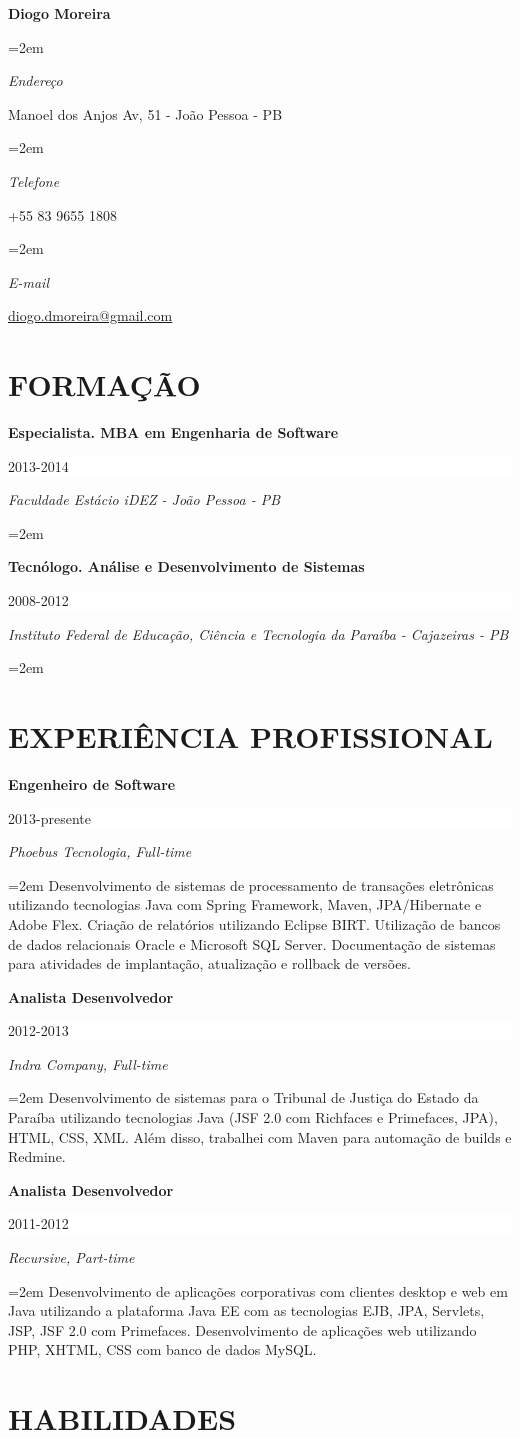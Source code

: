 \documentclass[paper=a4,fontsize=11pt]{article}
\newlength{\spacebox}
\newcommand{\sepspace}{\vspace*{1em}}
\newcommand{\MyName}[1]{ 
	\huge \usefont{OT1}{cmr}{b}{n} 
	\textbf{#1} \par \normalsize \normalfont
}
\newcommand{\NewPart}[1]{ \section*{\large \uppercase{#1}}}
\newcommand{\PersonalEntry}[2]{
		\noindent\hangindent=2em\hangafter=0 		%
		\parbox{\spacebox}{							%
		\textit{#1}}								%
		\hspace{1.5em} #2 \par}						%
\newcommand{\EducationEntry}[4]{
		\noindent \textbf{#1} \hfill 					%
		\colorbox{White}{%
			\parbox{6em}{%
			\hfill\color{Black}#2}} \par				%
		\noindent \textit{#3} \par						%
		\noindent\hangindent=2em\hangafter=0 \small #4 	%
		\normalsize \par}
\begin{document}
\MyName{Diogo Moreira}


\sepspace

\PersonalEntry{Endere\c{c}o}{Manoel dos Anjos Av, 51 - Jo\~ao Pessoa - PB}
\PersonalEntry{Telefone}{+55 83 9655 1808}
\PersonalEntry{E-mail}{\url{diogo.dmoreira@gmail.com}}

\NewPart{Forma\c{c}\~ao}{} 

\EducationEntry{Especialista. MBA em Engenharia de Software}{2013-2014}{Faculdade Est\'acio iDEZ - Jo\~ao Pessoa - PB}{}
\sepspace
\EducationEntry{Tecn\'ologo. An\'alise e Desenvolvimento de Sistemas}{2008-2012}{Instituto Federal de Educa\c{c}\~ao, Ci\^encia e Tecnologia da Para\'iba - Cajazeiras - PB}{}

\NewPart{Experi\^encia Profissional}{}

\EducationEntry{Engenheiro de Software}{2013-presente}{Phoebus Tecnologia, Full-time}{Desenvolvimento de sistemas de processamento de transa\c{c}\~oes eletr\^onicas utilizando tecnologias Java com Spring Framework, Maven, JPA/Hibernate e Adobe Flex. Cria\c{c}\~ao de relat\'orios utilizando Eclipse BIRT. Utiliza\c{c}\~ao de bancos de dados relacionais Oracle e Microsoft SQL Server. Documenta\c{c}\~ao de sistemas para atividades de implanta\c{c}\~ao, atualiza\c{c}\~ao e rollback de vers\~oes.}
\sepspace

\EducationEntry{Analista Desenvolvedor}{2012-2013}{Indra Company, Full-time}{Desenvolvimento de sistemas para o Tribunal de Justi\c{c}a do Estado da Para\'iba utilizando tecnologias Java (JSF 2.0 com Richfaces e Primefaces, JPA), HTML, CSS, XML. Al\'em disso, trabalhei com Maven para automa\c{c}\~ao de builds e Redmine.}
\sepspace

\EducationEntry{Analista Desenvolvedor}{2011-2012}{Recursive, Part-time}{Desenvolvimento de aplica\c{c}\~oes corporativas com clientes desktop e web em Java utilizando a plataforma Java EE com as tecnologias EJB, JPA, Servlets, JSP, JSF 2.0 com Primefaces. Desenvolvimento de aplica\c{c}\~oes web utilizando PHP, XHTML, CSS com banco de dados MySQL.}


\NewPart{Habilidades}{}
\end{document}
